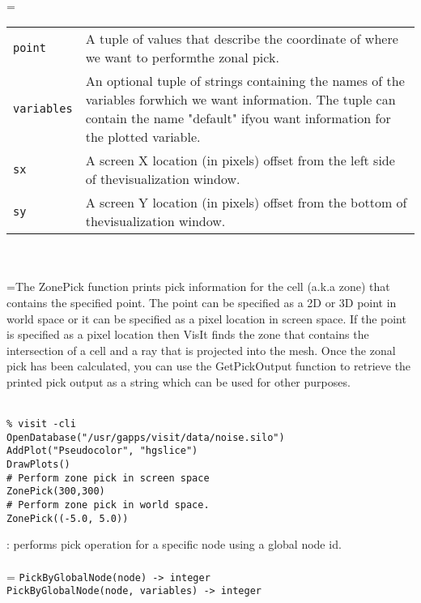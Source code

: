 \documentclass[10pt,a4paper]{report}
\begin{document}
 \\ 
\hangindent=\parindent 
\begin{tabular}{lp{9cm}}
\verb!point! & A tuple of values that describe the coordinate of where we want to performthe zonal pick. \\
\verb!variables! & An optional tuple of strings containing the names of the variables forwhich we want information. The tuple can contain the name "default" ifyou want information for the plotted variable. \\
\verb!sx! & A screen X location (in pixels) offset from the left side of thevisualization window. \\
\verb!sy! & A screen Y location (in pixels) offset from the bottom of thevisualization window. \\
\end{tabular} \\[-2mm]


 \\ 
\hangindent=\parindent The ZonePick function prints pick information for the cell (a.k.a zone) that contains the specified point. The point can be specified as a 2D or 3D point in world space or it can be specified as a pixel location in screen space. If the point is specified as a pixel location then VisIt finds the zone that contains the intersection of a cell and a ray that is projected into the mesh. Once the zonal pick has been calculated, you can use the GetPickOutput function to retrieve the printed pick output as a string which can be used for other purposes. \\[-3mm] 

\\[-6mm]
\begin{verbatim}% visit -cli
OpenDatabase("/usr/gapps/visit/data/noise.silo")
AddPlot("Pseudocolor", "hgslice")
DrawPlots()
# Perform zone pick in screen space
ZonePick(300,300)
# Perform zone pick in world space.
ZonePick((-5.0, 5.0))
\end{verbatim}
\newpage


{}
: performs pick operation for a specific node using a global node id.\\[-3mm]

 \\ 
\hangindent=\parindent 
\verb!PickByGlobalNode(node) -> integer!\\ 
\verb!PickByGlobalNode(node, variables) -> integer!\\ [-3mm]
\end{document}
